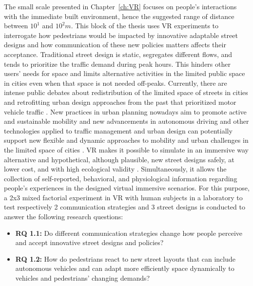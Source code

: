 The small scale presented in Chapter~\ref{ch:VR} focuses on people's interactions with the immediate built environment, hence the suggested range of distance between $10^1$ and $10^2 m$. This block of the thesis uses VR experiments to interrogate how pedestrians would be impacted by innovative adaptable street designs and how communication of these new policies matters affects their acceptance. Traditional street design is static, segregates different flows, and tends to prioritize the traffic demand during peak hours. This hinders other users' needs for space and limits alternative activities in the limited public space in cities even when that space is not needed off-peaks. Currently, there are intense public debates about redistribution of the limited space of streets in cities and retrofitting urban design approaches from the past that prioritized motor vehicle traffic \citep{Norton2008}. New practices in urban planning nowadays aim to promote active and sustainable mobility and new advancements in autonomous driving and other technologies applied to traffic management and urban design can potentially support new flexible and dynamic approaches to mobility and urban challenges in the limited space of cities \citep{HamiltonBaillieEnv2008}. VR makes it possible to simulate in an immersive way alternative and hypothetical, although plausible, new street designs safely, at lower cost, and with high ecological validity \citep{Oselinsky2023}. Simultaneously, it allows the collection of self-reported, behavioral, and physiological information regarding people's experiences in the designed virtual immersive scenarios. For this purpose, a 2x3 mixed factorial experiment in VR with human subjects in a laboratory to test respectively 2 communication strategies and 3 street designs is conducted to answer the following research questions:
\begin{itemize}
    \item \textbf{RQ 1.1:} Do different communication strategies change how people perceive and accept innovative street designs and policies?
    \item \textbf{RQ 1.2:} How do pedestrians react to new street layouts that can include autonomous vehicles and can adapt more efficiently space dynamically to vehicles and pedestrians' changing demands?
\end{itemize}

